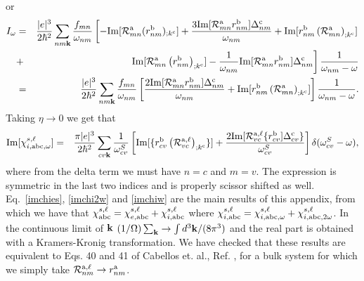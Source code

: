 \documentclass[floatfix,prb,aps,superscriptaddress,11pt,preprint]{revtex4}
\begin{document}
or
\begin{eqnarray}\label{pfian}
I_{\omega}
&=&
\frac{|e|^3}{2\hbar^2}
\sum_{nm\mathbf{k}}
\frac{f_{mn}}{\omega_{nm}}
\left[
-\mathrm{Im}[{\cal R}^{\mathrm{a}}_{mn}(r^{\mathrm{b}}_{nm})_{;k^{\mathrm{c}}}]
+
\frac{3\mathrm{Im}[{\cal R}^{\mathrm{a}}_{mn}r^{\mathrm{b}}_{nm}]\Delta^{\mathrm{c}}_{nm}}{\omega_{nm}}
+
\mathrm{Im}[r^{\mathrm{b}}_{nm}\left({\cal R}^{\mathrm{a}}_{mn}\right)_{;k^{\mathrm{c}}}]
\right.
\nonumber\\
&+&
\left.
\mathrm{Im}[
{\cal R}^{\mathrm{a}}_{mn}
\left(
r^{\mathrm{b}}_{nm}
\right)_{;k^{\mathrm{c}}}
]
-
\frac{1}{\omega_{nm}}
\mathrm{Im}[{\cal R}^{\mathrm{a}}_{mn}r^{\mathrm{b}}_{nm}]
\Delta^{\mathrm{c}}_{nm}
\right]
\frac{1}{\omega_{nm}-\omega}
\nonumber\\
&=&
\frac{|e|^3}{2\hbar^2}
\sum_{nm\mathbf{k}}
\frac{f_{mn}}{\omega_{nm}}
\left[
\frac{2\mathrm{Im}[{\cal R}^{\mathrm{a}}_{mn}r^{\mathrm{b}}_{nm}]\Delta^{\mathrm{c}}_{nm}}{\omega_{nm}}
+
\mathrm{Im}[r^{\mathrm{b}}_{nm}\left({\cal R}^{\mathrm{a}}_{mn}\right)_{;k^{\mathrm{c}}}]
\right]
\frac{1}{\omega_{nm}-\omega}
.
\end{eqnarray}
Taking $\eta\to 0$ we get that
\begin{eqnarray}\label{imchiw}
\mathrm{Im}[\chi_{i,\mathrm{a}\mathrm{b}\mathrm{c},\omega}^{s,\ell}]
&=&
\frac{\pi|e|^3}{2\hbar^2}
\sum_{cv\mathbf{k}}
\frac{1}{\omega^S_{cv}}
\left[
\mathrm{Im}[\{r^{\mathrm{b}}_{cv}\left({\cal R}^{\mathrm{a},\ell}_{vc}\right)_{;k^{\mathrm{c}}}\}]
+
\frac{2\mathrm{Im}[{\cal R}^{\mathrm{a},\ell}_{vc}\{r^{\mathrm{b}}_{cv}]\Delta^{\mathrm{c}}_{cv}\}}{\omega^S_{cv}}
\right]
\delta(\omega^S_{cv}-\omega)
,
\end{eqnarray} 
where from the delta term we must have $n=c$ and $m=v$. The expression
is symmetric in the last two indices and is properly scissor shifted
as well. Eq.~\eqref{imchies}, \eqref{imchi2w} and \eqref{imchiw}
are the main results of this appendix, from which we have that
$\chi_{\mathrm{a}\mathrm{b}\mathrm{c}}^{s,\ell}=\chi_{e,\mathrm{a}\mathrm{b}\mathrm{c}}^{s,\ell}+\chi_{i,\mathrm{a}\mathrm{b}\mathrm{c}}^{s,\ell}$ 
where
$\chi_{i,\mathrm{a}\mathrm{b}\mathrm{c}}^{s,\ell}=\chi_{i,\mathrm{a}\mathrm{b}\mathrm{c},\omega}^{s,\ell}+\chi_{i,\mathrm{a}\mathrm{b}\mathrm{c},2\omega}^{s,\ell}$. 
In the continuous limit of $\mathbf{k}$ 
$(1/\Omega)\sum_{\mathbf{k}}\to\int d^3\mathbf{k}/(8\pi^3)$ and the real part is 
obtained with a Kramers-Kronig transformation. 
We have checked that these results are equivalent to Eqs. 40 and 41 of
Cabellos et. al., Ref. , for a bulk system for which we
simply take ${\cal R}^{\mathrm{a},\ell}_{nm}\to r^{\mathrm{a}}_{nm}$.
\end{document}
